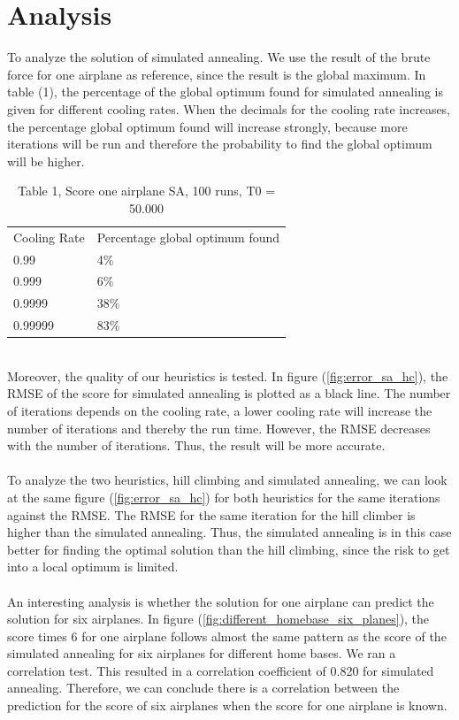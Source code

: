 \documentclass[journal]{IEEEtran}
\begin{document}
\section{Analysis}
To analyze the solution of simulated annealing. We use the result of the brute force for one airplane as reference, since the result is the global maximum. In table (1), the percentage of the global optimum found for simulated annealing is given for different cooling rates. When the decimals for the cooling rate increases, the percentage global optimum found will increase strongly, because more iterations will be run and therefore the probability to find the global optimum will be higher.
\begin{table}[h]
\begin{tabular}{ll}
Cooling Rate & Percentage global optimum found \\
0.99         & 4\%                             \\
0.999        & 6\%                             \\
0.9999       & 38\%                            \\
0.99999      & 83\%                              
\end{tabular}
\caption{\tiny{Table 1, Score one airplane SA, 100 runs, T0 = 50.000}}
\end{table}
\\
Moreover, the quality of our heuristics is tested. In figure (\ref{fig:error_sa_hc}), the RMSE of the score for simulated annealing is plotted as a black line. The number of iterations depends on the cooling rate, a lower cooling rate will increase the number of iterations and thereby the run time. However, the RMSE  decreases with the number of iterations. Thus, the result will be more accurate. 
\\
\\
To analyze the two heuristics, hill climbing and simulated annealing, we can look at the same figure (\ref{fig:error_sa_hc}) for both heuristics for the same iterations against the RMSE. The RMSE for the same iteration for the hill climber is  higher than the simulated annealing. Thus, the simulated annealing is in this case better for finding the optimal solution than the hill climbing, since the risk to get into a local optimum is limited. 
\\
\\
An interesting analysis is whether the solution for one airplane can predict the solution for six airplanes. In figure (\ref{fig:different_homebase_six_planes}), the score times 6 for one airplane follows almost the same pattern as the score of the simulated annealing for six airplanes for different home bases. We ran a correlation test. This resulted in a correlation coefficient of 0.820 for simulated annealing. Therefore, we can conclude there is a correlation between the prediction for the score of six airplanes when the score for one airplane is known. 
\\
\\
\end{document}
